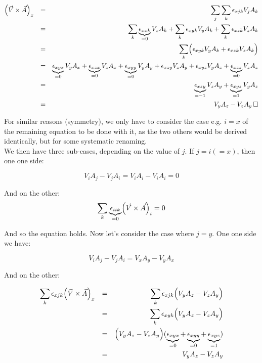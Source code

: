 \documentclass[solutions.tex]{subfiles}
\begin{document}
\begin{equation*}\begin{aligned}
	\Bigl(\vec{V} \times \vec{A}\Bigr)_x &&=&& \sum_j\sum_k\epsilon_{xjk}V_jA_k \\
	~ &&=&& \sum_k\underbrace{\epsilon_{xxk}}_{=0}V_xA_k
		+\sum_k\epsilon_{xyk}V_yA_k
		+\sum_k\epsilon_{xzk}V_zA_k \\
	~ &&=&& \sum_k\Bigl(\epsilon_{xyk}V_yA_k+\epsilon_{xzk}V_zA_k\Bigr) \\
	~ &&=&& \underbrace{\epsilon_{xyx}}_{=0}V_yA_x
			+\underbrace{\epsilon_{xzx}}_{=0}V_zA_x
		+ \underbrace{\epsilon_{xyy}}_{=0}V_yA_y+\epsilon_{xzy}V_zA_y
		+ \epsilon_{xyz}V_yA_z+\underbrace{\epsilon_{xzz}}_{=0}V_zA_z \\
	~ &&=&& \underbrace{\epsilon_{xzy}}_{=-1}V_zA_y +
		\underbrace{\epsilon_{xyz}}_{=1}V_yA_z \\
	~ &&=&& V_yA_z - V_zA_y \qed
\end{aligned}\end{equation*}

For similar reasons (symmetry), we only have to consider the case e.g.
$i=x$ of the remaining equation to be done with it, as the two others
would be derived identically, but for some systematic renaming. \\

We then have three sub-cases, depending on the value of $j$.
If $j=i (=x)$, then one one side:

\[	V_iA_j - V_jA_i = V_iA_i - V_iA_i = 0 \]

And on the other:
\[ \sum_k \underbrace{\epsilon_{iik}}_{=0}\Bigl(\vec{V} \times \vec{A}\Bigr)_i=0 \]

And so the equation holds. Now let's consider the case where $j=y$.
One one side we have:

\[	V_iA_j - V_jA_i = V_xA_y - V_yA_x \]

And on the other:

\begin{equation*}\begin{aligned}
	\sum_k \epsilon_{xjk}\Bigl(\vec{V} \times \vec{A}\Bigr)_x &&=&&
		\sum_k \epsilon_{xjk}\Bigl(V_yA_z - V_zA_y\Bigr) \\
	~ &&=&& \sum_k \epsilon_{xyk}\Bigl(V_yA_z - V_zA_y\Bigr) \\
	~ &&=&& \Bigl(V_yA_z - V_zA_y\Bigr)
		(\underbrace{\epsilon_{xyx}}_{=0} + \underbrace{\epsilon_{xyy}}_{=0}
			+ \underbrace{\epsilon_{xyz}}_{=1}) \\
	~ &&=&& V_yA_z - V_zA_y
\end{aligned}\end{equation*}
\end{document}
